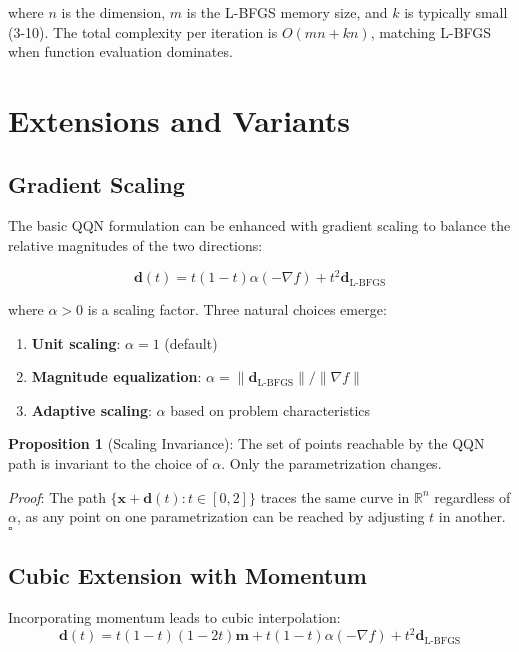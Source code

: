 where \(n\) is the dimension, \(m\) is the L-BFGS memory size, and \(k\) is typically small (3-10).
The total complexity per iteration is \(O(mn + kn)\), matching L-BFGS when function evaluation dominates.

\hypertarget{extensions-and-variants}{%
\section{Extensions and Variants}\label{extensions-and-variants}}

\hypertarget{gradient-scaling}{%
\subsection{Gradient Scaling}\label{gradient-scaling}}

The basic QQN formulation can be enhanced with gradient scaling to balance the relative magnitudes of the two directions:

\[\mathbf{d}(t) = t(1-t)\alpha(-\nabla f) + t^2 \mathbf{d}_{\text{L-BFGS}}\]

where \(\alpha > 0\) is a scaling factor. Three natural choices emerge:

\begin{enumerate}
\def\labelenumi{\arabic{enumi}.}
\tightlist
\item
  \textbf{Unit scaling}: \(\alpha = 1\) (default)
\item
  \textbf{Magnitude equalization}: \(\alpha = \|\mathbf{d}_{\text{L-BFGS}}\|/\|\nabla f\|\)
\item
  \textbf{Adaptive scaling}: \(\alpha\) based on problem characteristics
\end{enumerate}

\textbf{Proposition 1} (Scaling Invariance): The set of points reachable by the QQN path is invariant to the choice of \(\alpha\). Only the parametrization changes.

\emph{Proof}: The path \(\{\mathbf{x} + \mathbf{d}(t) : t \in [0, 2]\}\) traces the same curve in \(\mathbb{R}^n\) regardless of \(\alpha\), as any point on one parametrization can be reached by adjusting \(t\) in another. \(\square\)

\hypertarget{cubic-extension-with-momentum}{%
\subsection{Cubic Extension with Momentum}\label{cubic-extension-with-momentum}}

Incorporating momentum leads to cubic interpolation:
\[\mathbf{d}(t) = t(1-t)(1-2t)\mathbf{m} + t(1-t)\alpha(-\nabla f) + t^2 \mathbf{d}_{\text{L-BFGS}}\]

